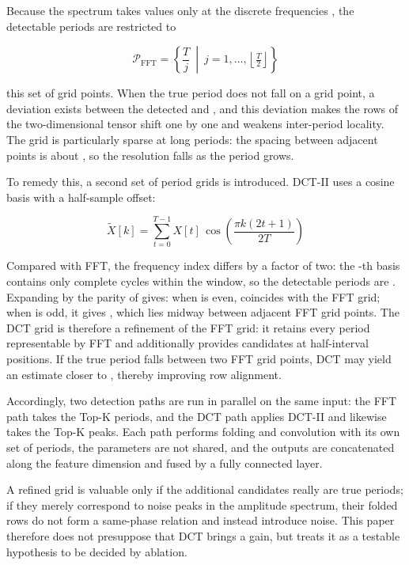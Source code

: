 \documentclass{iopjournal}
\begin{document}
Because the spectrum takes values only at the discrete frequencies , the detectable periods are restricted to

\begin{equation}
\mathcal{P}_{\text{FFT}} = \left\{\frac{T}{j}\ \middle|\ j = 1,\ldots,\left\lfloor \tfrac{T}{2}\right\rfloor\right\}
\end{equation}

this set of grid points. When the true period  does not fall on a grid point, a deviation exists between the detected  and , and this deviation makes the rows of the two-dimensional tensor shift one by one and weakens inter-period locality. The grid is particularly sparse at long periods: the spacing between adjacent points is about , so the resolution falls as the period grows.

To remedy this, a second set of period grids is introduced. DCT-II uses a cosine basis with a half-sample offset:

\begin{equation}
\tilde{X}[k] = \sum_{t=0}^{T-1} X[t]\,\cos\!\left(\frac{\pi k(2t+1)}{2T}\right)
\end{equation}

Compared with FFT, the frequency index differs by a factor of two: the  -th basis contains only  complete cycles within the window, so the detectable periods are . Expanding by the parity of  gives: when  is even,  coincides with the FFT grid; when  is odd, it gives , which lies midway between adjacent FFT grid points. The DCT grid is therefore a refinement of the FFT grid: it retains every period representable by FFT and additionally provides candidates at half-interval positions. If the true period falls between two FFT grid points, DCT may yield an estimate closer to , thereby improving row alignment.

Accordingly, two detection paths are run in parallel on the same input: the FFT path takes the Top-K periods, and the DCT path applies DCT-II and likewise takes the Top-K peaks. Each path performs folding and convolution with its own set of periods, the parameters are not shared, and the outputs are concatenated along the feature dimension and fused by a fully connected layer.

A refined grid is valuable only if the additional candidates really are true periods; if they merely correspond to noise peaks in the amplitude spectrum, their folded rows do not form a same-phase relation and instead introduce noise. This paper therefore does not presuppose that DCT brings a gain, but treats it as a testable hypothesis to be decided by ablation.
\end{document}
